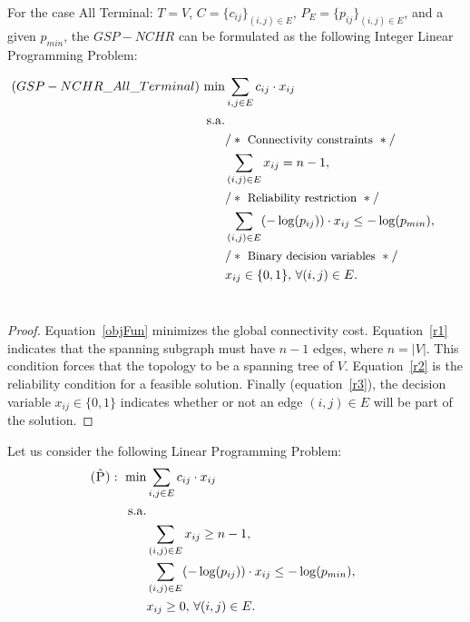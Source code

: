 \begin{lemma} For the case All Terminal: $T=V$, $C=\{c_{ij}\}_{(i,j)\in E}$, $P_{E}=\{p_{ij}\}_{(i,j)\in
E}$, and a given $p_{min}$, the $GSP-NCHR$ can be formulated as the
following Integer Linear Programming Problem:

\begin{align}
 (GSP-NCHR\_All\_Terminal)~ \mathrm{min} &  \sum_{i,j\in E} c_{ij}\cdot x_{ij}   \label{objFun}\\
 \mathrm{s.a.} & \nonumber\\
 &      /*~\mbox{\small Connectivity constraints}~*/& \nonumber\\
 &                  \sum_{(i,j)\in E} x_{ij}= n-1, & \label{r1} &\\
 &      /*~\mbox{\small Reliability restriction}~*/& \nonumber\\
 &                   \sum_{(i,j)\in E} (-\log(p_{ij}))\cdot x_{ij}\leq -\log(p_{min}),  & \label{r2} &\\
 &      /*~\mbox{\small Binary decision variables}~*/ \nonumber\\
 &                 x_{ij}\in \{0,1\},\, \forall (i,j)\in E.   & \label{r3}  &
\end{align}~\\
\end{lemma}
\begin{proof} Equation~\ref{objFun} minimizes the global
connectivity cost. Equation~\ref{r1} indicates that the
spanning subgraph must have $n-1$ edges, where $n=|V|$. This
condition forces that the topology to be a spanning tree of $V$.
Equation~\ref{r2} is the reliability condition for a feasible
solution. Finally (equation~\ref{r3}), the decision variable
$x_{ij}\in \{0,1\}$ indicates whether or not an edge $(i,j)\in E$
will be part of the solution.  \end{proof}
Let us consider the following Linear Programming Problem:
\begin{align}
 \textsc{(\^{P})}:~ \mathrm{min} &  \sum_{i,j\in E} c_{ij}\cdot x_{ij}   \nonumber\\
 \mathrm{s.a.} & \nonumber\\
 &                  \sum_{(i,j)\in E} x_{ij}\geq n-1, & \nonumber &\\
 &                   \sum_{(i,j)\in E} (-\log(p_{ij}))\cdot x_{ij}\leq -\log(p_{min}),  & \nonumber &\\
 &                 x_{ij}\geq 0,\, \forall (i,j)\in E.   & \nonumber &
\end{align}  ~\\

